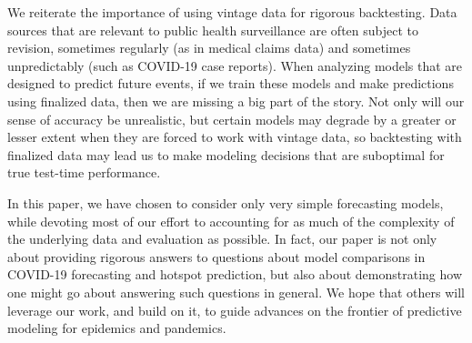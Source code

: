 \documentclass[9pt,twocolumn,twoside,lineno]{pnas-new}
\begin{document}
We reiterate the importance of using vintage data for rigorous backtesting. Data
sources that are relevant to public health surveillance are often subject to
revision, sometimes regularly (as in medical claims data) and sometimes
unpredictably (such as COVID-19 case reports).  When analyzing models that are
designed to predict future events, if we train these models and make predictions
using finalized data, then we are missing a big part of the story.  Not only
will our sense of accuracy be unrealistic, but certain models may degrade by a
greater or lesser extent when they are forced to work with vintage data, so 
backtesting with finalized data may lead us to make modeling decisions that are
suboptimal for true test-time performance.     

In this paper, we have chosen to consider only very simple forecasting models,
while devoting most of our effort to accounting for as much of the complexity of
the underlying data and evaluation as possible. In fact, our paper is not only
about providing rigorous answers to questions about model comparisons in
COVID-19 forecasting and hotspot prediction, but also about demonstrating how 
one might go about answering such questions in general. We hope that others will
leverage our work, and build on it, to guide advances on the frontier of
predictive modeling for epidemics and pandemics.    


\showacknow{} %


\end{document}
